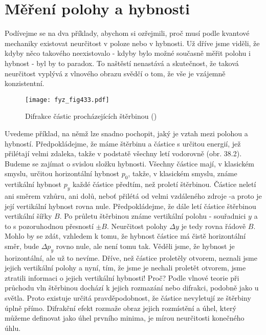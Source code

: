   \section{Měření polohy a hybnosti}\label{fyz:IchapXXXVIIIsecII}
    Podívejme se na dva příklady, abychom si ozřejmili, proč musí podle kvantové mechaniky existovat
    neurčitost v poloze nebo v hybnosti. Už dříve jsme viděli, že kdyby něco takového neexistovalo -
    kdyby bylo možné současně měřit polohu i hybnost - byl by to paradox. To naštěstí nenastává a
    skutečnost, že taková neurčitost vyplývá z vlnového obrazu svědčí o tom, že vše je vzájemně
    konzistentní.

    \begin{figure}[ht!] %
      \centering
      \texttt{[image: fyz\_fig433.pdf]}
      \caption{Difrakce částic procházejících štěrbinou (\cite[s.~511]{Feynman01})}
      \label{fyz:fig433}
    \end{figure}

    Uvedeme příklad, na němž lze snadno pochopit, jaký je vztah mezi polohou a hybností.
    Předpokládejme, že máme štěrbinu a částice s určitou energií, jež přilétají velmi zdaleka, takže
    v podstatě všechny letí vodorovně (obr. 38.2). Budeme se zajímat o svislou složku hybnosti.
    Všechny částice mají, v klasickém smyslu, určitou horizontální hybnost \(p_0\), takže, v
    klasickém smyslu, známe vertikální hybnost \(p_y\) každé částice předtím, než proletí štěrbinou.
    Částice neletí ani směrem vzhůru, ani dolů, neboť přilétá od velmi vzdáleného zdroje -a proto je
    její vertikální hybnost rovna nule. Předpokládejme, že dále letí částice štěrbinou vertikální
    šířky \(B\). Po průletu štěrbinou známe vertikální polohu - souřadnici \(y\) a to s pozoruhodnou
    přesností \(\pm B\). Neurčitost polohy \(\Delta y\) je tedy rovna řádově \(B\). Mohlo by se
    zdát, vzhledem k tomu, že hybnost částice má čistě horizontální směr, bude \(\Delta p_y\) rovno
    nule, ale není tomu tak. Věděli jsme, že hybnost je horizontální, ale už to nevíme. Dříve, než
    částice proletěly otvorem, neznali jsme jejich vertikální polohy a nyní, tím, že jsme je nechali
    proletět otvorem, jsme ztratili informaci o jejich vertikální hybnosti! Proč? Podle vlnové
    teorie při průchodu vln štěrbinou dochází k jejich rozmazání nebo difrakci, podobně jako u
    světla. Proto existuje určitá pravděpodobnost, že částice nevyletují ze štěrbiny úplně přímo.
    Difrakční efekt rozmaže obraz jejich rozmístění a úhel, který můžeme definovat jako úhel prvního
    minima, je mírou neurčitosti konečného úhlu.

